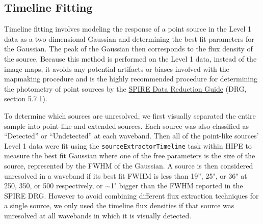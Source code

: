\subsection{Timeline Fitting}\label{timeline}
Timeline fitting involves modeling the response of a point source in the Level 1 data as a two dimensional Gaussian and determining the best fit parameters for the Gaussian. The peak of the Gaussian then corresponds to the flux density of the source. Because this method is performed on the Level 1 data, instead of the image maps, it avoids any potential artifacts or biases involved with the mapmaking procedure and is the highly recommended procedure for determining the photometry of point sources by the \href{http://herschel.esac.esa.int/hcss-doc-11.0/index.jsp\#spire_drg:_start}{SPIRE Data Reduction Guide} (DRG, section 5.7.1).

To determine which sources are unresolved, we first visually separated the entire sample into point-like and extended sources. Each source was also classified as ``Detected'' or ``Undetected'' at each waveband. Then all of the point-like sources' Level 1 data were fit using the \texttt{sourceExtractorTimeline} task within HIPE to measure the best fit Gaussian where one of the free parameters is the size of the source, represented by the FWHM of the Gaussian. A source is then considered unresolved in a waveband if its best fit FWHM is less than 19'', 25", or 36" at 250, 350, or 500 \micron{} respectively, or $\sim$1" bigger than the FWHM reported in the SPIRE DRG. However to avoid combining different flux extraction techniques for a single source, we only used the timeline flux densities if that source was unresolved at all wavebands in which it is visually detected.